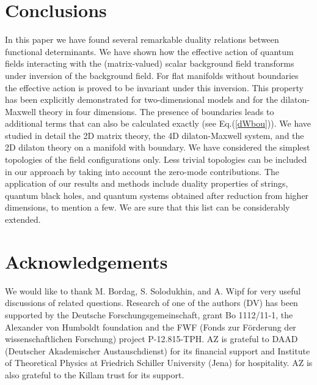 \documentclass[a4paper,12pt]{article}
\begin{document}
\section{Conclusions}
In this paper we have found several remarkable duality relations
between functional determinants. We have shown how
the effective action of quantum fields interacting with the 
(matrix-valued) scalar background field transforms under
inversion of the background field. For flat manifolds without boundaries
the effective action is proved to be invariant under this inversion.
This property has been explicitly demonstrated for two-dimensional
models and for the dilaton-Maxwell theory in four dimensions.
The presence of boundaries leads to 
additional terms that can also be calculated exactly (see
Eq.(\ref{dWbou})). We have studied in detail the 2D matrix
theory, the 4D dilaton-Maxwell system, and the 2D dilaton theory on
a manifold with boundary. We have considered the simplest topologies
of the field configurations only. Less trivial topologies can be
included in our approach by taking into account the zero-mode
contributions.
The application of our results and methods
include duality properties of strings, quantum black holes, 
and quantum systems obtained after reduction from higher
dimensions,
to mention a few. 
We are sure that this list can be considerably extended.



\section*{Acknowledgements}
We would like to thank M. Bordag, S. Solodukhin, and A. Wipf
for very useful discussions of related questions.
Research of one of the authors (DV) has been supported by
the Deutsche Forschungsgemeinschaft, grant Bo 1112/11-1,
the Alexander von Humboldt foundation and 
the FWF (Fonds
zur F\"{o}rderung der wissenschaftlichen Forschung) 
project P-12.815-TPH.
AZ is grateful to DAAD (Deutscher Akademischer Austauschdienst)
for its financial support
and Institute of Theoretical Physics at Friedrich
Schiller University (Jena) for hospitality.  
AZ is also grateful to the Killam trust for its support. 
\end{document}
